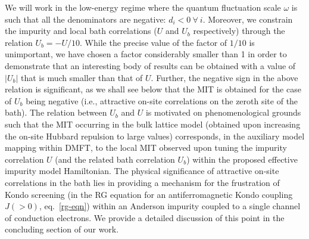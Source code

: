 \documentclass{iopart}
\begin{document}
We will work in the low-energy regime where the quantum fluctuation scale \(\omega\) is such that all the denominators are negative: \(d_i < 0 ~\forall~i\). Moreover, we constrain the impurity and local bath correlations (\(U\) and \(U_b\) respectively) through the relation \(U_{b} = -U/10\). While the precise value of the factor of \(1/10\) is unimportant, we have 
chosen a factor considerably smaller than 1 in order to demonstrate that an interesting body of results can be obtained with a value of $|U_{b}|$ that is much smaller than that of $U$. Further, the negative sign in the above relation is significant, as we shall see below that the MIT is obtained for the case of \(U_b\) being negative (i.e., attractive on-site correlations on the zeroth site of the bath). The relation between $U_{b}$ and $U$ is motivated on phenomenological grounds such that the MIT occurring in the bulk lattice model (obtained upon increasing the on-site Hubbard repulsion to large values) corresponds, in the auxiliary model mapping within DMFT, to the local MIT observed upon tuning the impurity correlation $U$ (and the related bath correlation \(U_b\)) within the proposed effective impurity model Hamiltonian. The physical significance of attractive on-site correlations in the bath lies in providing a mechanism for the frustration of Kondo screening (in the RG equation for an antiferromagnetic Kondo coupling $J(>0)$, eq.~\eqref{rg-eqn}) within an Anderson impurity coupled to a single channel of conduction electrons. We provide a detailed discussion of this point in the concluding section of our work.
\end{document}
